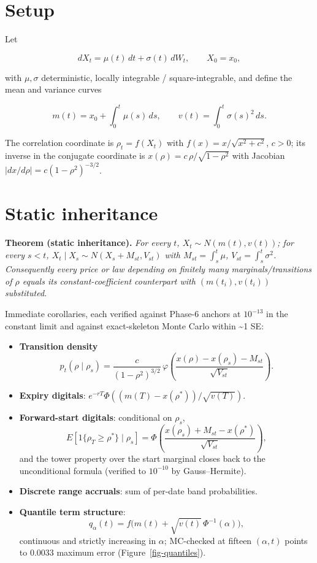 \documentclass[
  english,
  10pt,
  letterpaper,
  DIV=11,
  numbers=noendperiod]{scrartcl}
\providecommand{\tightlist}{%
  \setlength{\itemsep}{0pt}\setlength{\parskip}{0pt}}
\begin{document}
\section{Setup}\label{sec-setup}

Let

\[
dX_t=\mu(t)\,dt+\sigma(t)\,dW_t,\qquad X_0=x_0,
\]

with \(\mu,\sigma\) deterministic, locally integrable /
square-integrable, and define the mean and variance curves

\[
m(t)=x_0+\int_0^t\mu(s)\,ds,\qquad v(t)=\int_0^t\sigma(s)^2\,ds .
\]

The correlation coordinate is \(\rho_t=f(X_t)\) with
\(f(x)=x/\sqrt{x^2+c^2}\), \(c>0\); its inverse in the conjugate
coordinate is \(x(\rho)=c\,\rho/\sqrt{1-\rho^2}\) with Jacobian
\(|dx/d\rho|=c(1-\rho^2)^{-3/2}\).

\section{Static inheritance}\label{sec-static}

\textbf{Theorem (static inheritance).} \emph{For every \(t\),
\(X_t\sim N(m(t),v(t))\); for every \(s<t\),
\(X_t\mid X_s\sim N(X_s+M_{st},V_{st})\) with \(M_{st}=\int_s^t\mu\),
\(V_{st}=\int_s^t\sigma^2\). Consequently every price or law depending
on finitely many marginals/transitions of \(\rho\) equals its
constant-coefficient counterpart with \((m(t_i),v(t_i))\) substituted.}

Immediate corollaries, each verified against Phase-6 anchors at
\(10^{-13}\) in the constant limit and against exact-skeleton Monte
Carlo within \textasciitilde1 SE:

\begin{itemize}
\tightlist
\item
  \textbf{Transition density}
  \[p_t(\rho\mid\rho_s)=\frac{c}{(1-\rho^2)^{3/2}}\,
  \varphi\!\left(\frac{x(\rho)-x(\rho_s)-M_{st}}{\sqrt{V_{st}}}\right).\]
\item
  \textbf{Expiry digitals}:
  \(e^{-rT}\Phi((m(T)-x(\rho^*))/\sqrt{v(T)})\).
\item
  \textbf{Forward-start digitals}: conditional on \(\rho_s\),
  \[E[1\{\rho_T\ge\rho^*\}\mid\rho_s]
  =\Phi\!\left(\frac{x(\rho_s)+M_{st}-x(\rho^*)}{\sqrt{V_{st}}}\right),\]
  and the tower property over the start marginal closes back to the
  unconditional formula (verified to \(10^{-10}\) by Gauss--Hermite).
\item
  \textbf{Discrete range accruals}: sum of per-date band probabilities.
\item
  \textbf{Quantile term structure}:
  \[q_\alpha(t)=f\big(m(t)+\sqrt{v(t)}\,\Phi^{-1}(\alpha)\big),\]
  continuous and strictly increasing in \(\alpha\); MC-checked at
  fifteen \((\alpha,t)\) points to 0.0033 maximum error
  (Figure~\ref{fig-quantiles}).
\end{itemize}
\end{document}
